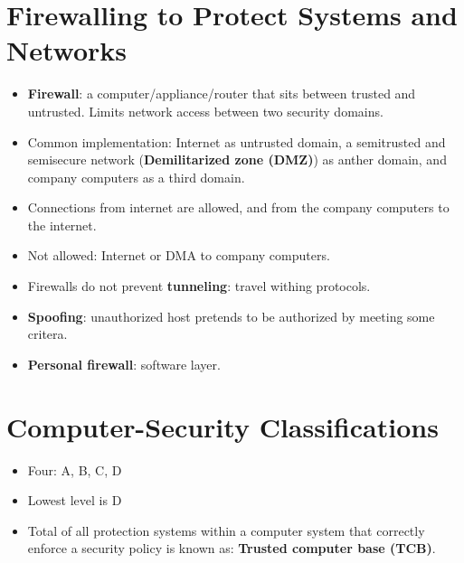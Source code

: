 \documentclass[10pt]{report}
\begin{document}
	\section{Firewalling to Protect Systems and Networks}
		\begin{itemize}
			\item \textbf{Firewall}: a computer/appliance/router that sits between trusted and untrusted. Limits network access between two security domains.
			\item Common implementation: Internet as untrusted domain, a semitrusted and semisecure network (\textbf{Demilitarized zone (DMZ)}) as anther domain, and company computers as a third domain.
			\item Connections from internet are allowed, and from the company computers to the internet.
			\item Not allowed: Internet or DMA to company computers.
			\item Firewalls do not prevent \textbf{tunneling}: travel withing protocols.
			\item \textbf{Spoofing}: unauthorized host pretends to be authorized by meeting some critera.
			\item \textbf{Personal firewall}: software layer.
		\end{itemize}

	\section{Computer-Security Classifications}
		\begin{itemize}
			\item Four: A, B, C, D
			\item Lowest level is D
			\item Total of all protection systems within a computer system that correctly enforce a security policy is known as: \textbf{Trusted computer base (TCB)}.
		\end{itemize}
\end{document}

